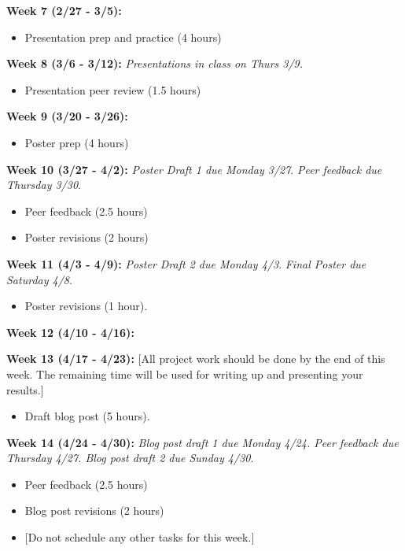 \documentclass[
  letterpaper,
  DIV=11,
  numbers=noendperiod]{scrartcl}
\providecommand{\tightlist}{%
  \setlength{\itemsep}{0pt}\setlength{\parskip}{0pt}}\usepackage{longtable,booktabs,array}
\begin{document}
\textbf{Week 7 (2/27 - 3/5):}

\begin{itemize}
\tightlist
\item
  Presentation prep and practice (4 hours)
\end{itemize}

\textbf{Week 8 (3/6 - 3/12):} \emph{Presentations in class on Thurs
3/9.}

\begin{itemize}
\tightlist
\item
  Presentation peer review (1.5 hours)
\end{itemize}

\textbf{Week 9 (3/20 - 3/26):}

\begin{itemize}
\tightlist
\item
  Poster prep (4 hours)
\end{itemize}

\textbf{Week 10 (3/27 - 4/2):} \emph{Poster Draft 1 due Monday 3/27}.
\emph{Peer feedback due Thursday 3/30}.

\begin{itemize}
\item
  Peer feedback (2.5 hours)
\item
  Poster revisions (2 hours)
\end{itemize}

\textbf{Week 11 (4/3 - 4/9):} \emph{Poster Draft 2 due Monday 4/3}.
\emph{Final Poster due Saturday 4/8}.

\begin{itemize}
\tightlist
\item
  Poster revisions (1 hour).
\end{itemize}

\textbf{Week 12 (4/10 - 4/16):}

\textbf{Week 13 (4/17 - 4/23):} {[}All project work should be done by
the end of this week. The remaining time will be used for writing up and
presenting your results.{]}

\begin{itemize}
\tightlist
\item
  Draft blog post (5 hours).
\end{itemize}

\textbf{Week 14 (4/24 - 4/30):} \emph{Blog post draft 1 due Monday 4/24.
Peer feedback due Thursday 4/27. Blog post draft 2 due Sunday 4/30}.

\begin{itemize}
\tightlist
\item
  Peer feedback (2.5 hours)
\item
  Blog post revisions (2 hours)
\item
  {[}Do not schedule any other tasks for this week.{]}
\end{itemize}
\end{document}
